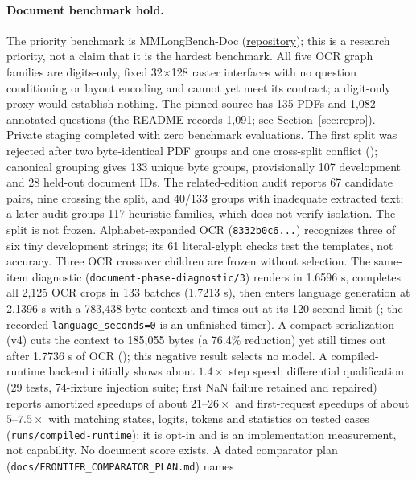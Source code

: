 \documentclass[11pt]{article}
\begin{document}
\paragraph{Document benchmark hold.} The priority benchmark is MMLongBench-Doc
(\href{https://github.com/mayubo2333/MMLongBench-Doc}{repository}); this is a research priority, not
a claim that it is the hardest benchmark. All five OCR graph families are digits-only, fixed
32$\times$128 raster interfaces with no question conditioning or layout encoding and cannot yet
meet its contract; a digit-only proxy would establish nothing. The pinned source has 135 PDFs and
1{,}082 annotated questions (the README records 1{,}091; see Section~\ref{sec:repro}). Private
staging completed with zero benchmark evaluations. The first split was rejected after two
byte-identical PDF groups and one cross-split conflict
(); canonical grouping gives 133 unique byte
groups, provisionally 107 development and 28 held-out document IDs. The related-edition audit
reports 67 candidate pairs, nine crossing the split, and 40/133 groups with inadequate extracted
text; a later audit groups 117 heuristic families, which does not verify isolation. The split is not
frozen. Alphabet-expanded OCR (\texttt{8332b0c6...}) recognizes three of six tiny development
strings; its 61 literal-glyph checks test the templates, not accuracy. Three OCR crossover children
are frozen without selection. The same-item diagnostic (\texttt{document-phase-diagnostic/3})
renders in 1.6596 s, completes all 2{,}125 OCR crops in 133 batches (1.7213 s), then enters
language generation at 2.1396 s with a 783{,}438-byte context and times out at its 120-second limit
(; the recorded
\texttt{language\_seconds=0} is an unfinished timer). A compact serialization (v4) cuts the context
to 185{,}055 bytes (a 76.4\% reduction) yet still times out after 1.7736 s of OCR
(); this negative result selects no
model. A compiled-runtime backend initially shows about $1.4\times$ step speed; differential
qualification (29 tests, 74-fixture injection suite; first NaN failure retained and repaired)
reports amortized speedups of about $21$--$26\times$ and first-request speedups of about
$5$--$7.5\times$ with matching states, logits, tokens and statistics on tested cases
(\texttt{runs/compiled-runtime}); it is opt-in and is an implementation measurement, not capability.
No document score exists. A dated comparator plan (\texttt{docs/FRONTIER\_COMPARATOR\_PLAN.md}) names
\end{document}
